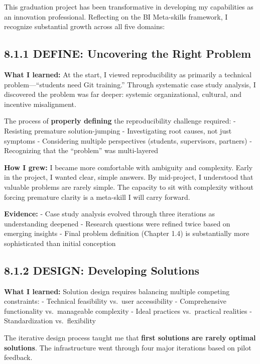 \documentclass[
  oneside,
  open=any]{scrbook}
\begin{document}
This graduation project has been transformative in developing my
capabilities as an innovation professional. Reflecting on the BI
Meta-skills framework, I recognize substantial growth across all five
domains:

\subsection{8.1.1 DEFINE: Uncovering the Right
Problem}\label{define-uncovering-the-right-problem}

\textbf{What I learned:} At the start, I viewed reproducibility as
primarily a technical problem---``students need Git training.'' Through
systematic case study analysis, I discovered the problem was far deeper:
systemic organizational, cultural, and incentive misalignment.

The process of \textbf{properly defining} the reproducibility challenge
required: - Resisting premature solution-jumping - Investigating root
causes, not just symptoms - Considering multiple perspectives (students,
supervisors, partners) - Recognizing that the ``problem'' was
multi-layered

\textbf{How I grew:} I became more comfortable with ambiguity and
complexity. Early in the project, I wanted clear, simple answers. By
mid-project, I understood that valuable problems are rarely simple. The
capacity to sit with complexity without forcing premature clarity is a
meta-skill I will carry forward.

\textbf{Evidence:} - Case study analysis evolved through three
iterations as understanding deepened - Research questions were refined
twice based on emerging insights - Final problem definition (Chapter
1.4) is substantially more sophisticated than initial conception

\subsection{8.1.2 DESIGN: Developing
Solutions}\label{design-developing-solutions}

\textbf{What I learned:} Solution design requires balancing multiple
competing constraints: - Technical feasibility vs.~user accessibility -
Comprehensive functionality vs.~manageable complexity - Ideal practices
vs.~practical realities - Standardization vs.~flexibility

The iterative design process taught me that \textbf{first solutions are
rarely optimal solutions}. The infrastructure went through four major
iterations based on pilot feedback.
\end{document}
